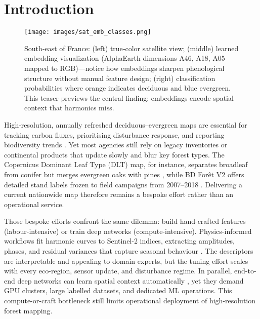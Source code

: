 \documentclass[utf8]{FrontiersinHarvard}
\begin{document}
\section{Introduction}

\begin{figure}[H]
    \centering
    \texttt{[image: images/sat\_emb\_classes.png]}
    \caption{South‑east of France: (left) true‑color satellite view; (middle) learned embedding visualization (AlphaEarth dimensions A46, A18, A05 mapped to RGB)—notice how embeddings sharpen phenological structure without manual feature design; (right) classification probabilities where orange indicates deciduous and blue evergreen. This teaser previews the central finding: embeddings encode spatial context that harmonics miss.}
    \label{fig:teaser_sat_emb_class}
\end{figure}

High-resolution, annually refreshed deciduous–evergreen maps are essential for tracking carbon fluxes, prioritising disturbance response, and reporting biodiversity trends \citep{Zhu2014,Zhao2019,Verbesselt2010a,Verbesselt2010b,Kennedy2010,Kennedy2018}. Yet most agencies still rely on legacy inventories or continental products that update slowly and blur key forest types. The Copernicus Dominant Leaf Type (DLT) map, for instance, separates broadleaf from conifer but merges evergreen oaks with pines \citep{EU2024a}, while BD Forêt V2 offers detailed stand labels frozen to field campaigns from 2007–2018 \citep{IGN2024}. Delivering a current nationwide map therefore remains a bespoke effort rather than an operational service.

Those bespoke efforts confront the same dilemma: build hand-crafted features (labour-intensive) or train deep networks (compute-intensive). Physics-informed workflows fit harmonic curves to Sentinel-2 indices, extracting amplitudes, phases, and residual variances that capture seasonal behaviour \citep{Inglada2017,Li2023,Bolton2020}. The descriptors are interpretable and appealing to domain experts, but the tuning effort scales with every eco-region, sensor update, and disturbance regime. In parallel, end-to-end deep networks can learn spatial context automatically \citep{Low2020,Xie2024FoundationEffective}, yet they demand GPU clusters, large labelled datasets, and dedicated ML operations. This compute-or-craft bottleneck still limits operational deployment of high-resolution forest mapping.
\end{document}
